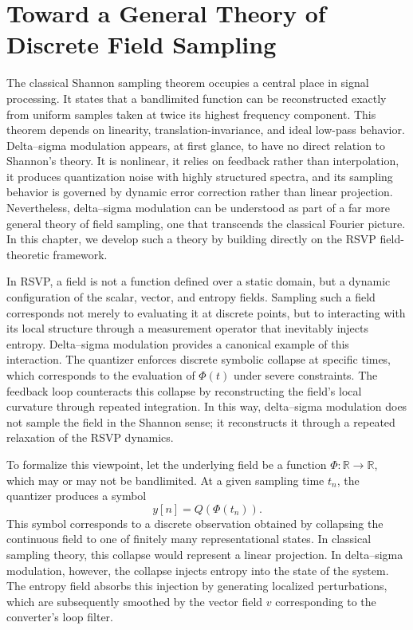 
\chapter{Toward a General Theory of Discrete Field Sampling}

The classical Shannon sampling theorem occupies a central place in signal processing. It states that a bandlimited function can be reconstructed exactly from uniform samples taken at twice its highest frequency component. This theorem depends on linearity, translation-invariance, and ideal low-pass behavior. Delta–sigma modulation appears, at first glance, to have no direct relation to Shannon’s theory. It is nonlinear, it relies on feedback rather than interpolation, it produces quantization noise with highly structured spectra, and its sampling behavior is governed by dynamic error correction rather than linear projection. Nevertheless, delta–sigma modulation can be understood as part of a far more general theory of field sampling, one that transcends the classical Fourier picture. In this chapter, we develop such a theory by building directly on the RSVP field-theoretic framework.

In RSVP, a field is not a function defined over a static domain, but a dynamic configuration of the scalar, vector, and entropy fields. Sampling such a field corresponds not merely to evaluating it at discrete points, but to interacting with its local structure through a measurement operator that inevitably injects entropy. Delta–sigma modulation provides a canonical example of this interaction. The quantizer enforces discrete symbolic collapse at specific times, which corresponds to the evaluation of \(\Phi(t)\) under severe constraints. The feedback loop counteracts this collapse by reconstructing the field’s local curvature through repeated integration. In this way, delta–sigma modulation does not sample the field in the Shannon sense; it reconstructs it through a repeated relaxation of the RSVP dynamics.

To formalize this viewpoint, let the underlying field be a function \( \Phi : \mathbb{R} \to \mathbb{R} \), which may or may not be bandlimited. At a given sampling time \(t_n\), the quantizer produces a symbol
\[
y[n] = Q(\Phi(t_n)).
\]
This symbol corresponds to a discrete observation obtained by collapsing the continuous field to one of finitely many representational states. In classical sampling theory, this collapse would represent a linear projection. In delta–sigma modulation, however, the collapse injects entropy into the state of the system. The entropy field absorbs this injection by generating localized perturbations, which are subsequently smoothed by the vector field \(v\) corresponding to the converter’s loop filter.

